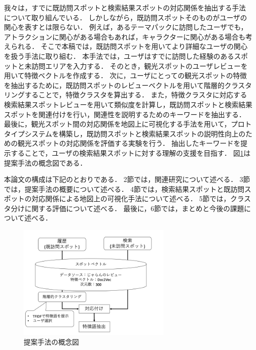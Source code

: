 \documentclass{deimj}
\begin{document}
我々は，すでに既訪問スポットと検索結果スポットの対応関係を抽出する手法について取り組んでいる\cite{潘DEIM}．
しかしながら，既訪問スポットそのものがユーザの関心を表すとは限らない．
例えば，あるテーマパックに訪問したユーザでも，アトラクションに関心がある場合もあれば，キャラクターに関心がある場合も考えられる．
そこで本稿では，既訪問スポットを用いてより詳細なユーザの関心を扱う手法に取り組む．
本手法では，ユーザはすでに訪問した経験のあるスポットと未訪問エリアを入力する．
そのとき，観光スポットのユーザレビューを用いて特徴ベクトルを作成する．
次に，ユーザにとっての観光スポットの特徴を抽出するために，既訪問スポットのレビューベクトルを用いて階層的クラスタリングすることで，特徴クラスタを算出する．
また，特徴クラスタに対応する検索結果スポットレビューを用いて類似度を計算し，既訪問スポットと検索結果スポットを関連付けを行い，関連性を説明するためのキーワードを抽出する．
最後に，観光スポット間の対応関係を地図上に可視化する手法\cite{潘STI}を用いて，プロトタイプシステムを構築し，既訪問スポットと検索結果スポットの説明性向上のための観光スポットの対応関係を評価する実験を行う．
抽出したキーワードを提示することで，ユーザの検索結果スポットに対する理解の支援を目指す．
図\ref{fig:image}は提案手法の概念図である．

本論文の構成は下記のとおりである．
2節では，関連研究について述べる．
3節では，提案手法の概要について述べる．
4節では，検索結果スポットと既訪問スポットの対応関係による地図上の可視化手法について述べる．
5節では，クラスタ分けに関する評価について述べる．
最後に，6節では，まとめと今後の課題について述べる．

\begin{figure}[t]
  \begin{center}
    \includegraphics[clip,width=7.5cm]{picture/system_image.png}
    \caption{提案手法の概念図}
    \label{fig:image}
   \end{center}
\end{figure}


\end{document}
